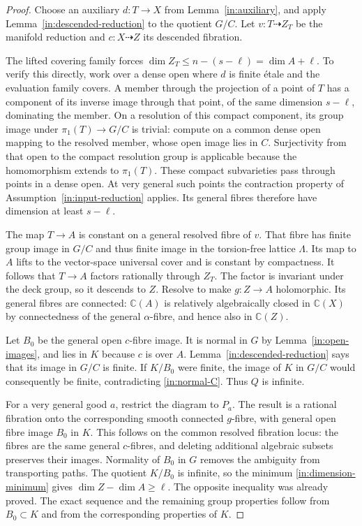 \begin{proof}
Choose an auxiliary $d:T\to X$ from Lemma~\ref{in:auxiliary}, and
apply Lemma~\ref{in:descended-reduction} to the quotient $G/C$.
Let $v:T\dashrightarrow Z_T$ be the manifold reduction and
$c:X\dashrightarrow Z$ its descended fibration.

The lifted covering family forces
$\dim Z_T\le n-(s-\ell)=\dim A+\ell$.  To verify this directly,
work over a dense open where $d$ is finite \'etale and the evaluation
family covers.  A member through the projection of a point of $T$
has a component of its inverse image through that point, of the same
dimension $s-\ell$, dominating the member.  On a resolution of this
compact component, its group image under $\pi_1(T)\to G/C$ is
trivial: compute on a common dense open mapping to the resolved member,
whose open image lies in $C$.  Surjectivity from that open to the
compact resolution group is applicable because the homomorphism
extends to $\pi_1(T)$.  These compact subvarieties pass through points
in a dense open.  At very general such points the contraction property
of Assumption~\ref{in:input-reduction} applies.  Its general fibres
therefore have dimension at least $s-\ell$.

The map $T\to A$ is constant on a general resolved fibre of $v$.
That fibre has finite group image in $G/C$ and thus finite image in
the torsion-free lattice $\Lambda$.  Its map to $A$ lifts to the
vector-space universal cover and is constant by compactness.  It
follows that $T\to A$ factors rationally through $Z_T$.  The factor
is invariant under the deck group, so it descends to $Z$.  Resolve
to make $g:Z\to A$ holomorphic.  Its general fibres are connected:
$\mathbb C(A)$ is relatively algebraically closed in $\mathbb C(X)$
by connectedness of the general $\alpha$-fibre, and hence also in
$\mathbb C(Z)$.

Let $B_0$ be the general open $c$-fibre image.  It is normal in $G$
by Lemma~\ref{in:open-images}, and lies in $K$ because $c$ is over
$A$.  Lemma~\ref{in:descended-reduction} says that its image in
$G/C$ is finite.  If $K/B_0$ were finite, the image of $K$ in $G/C$
would consequently be finite, contradicting \eqref{in:normal-C}.
Thus $Q$ is infinite.

For a very general good $a$, restrict the diagram to $P_a$.  The
result is a rational fibration onto the corresponding smooth connected
$g$-fibre, with general open fibre image $B_0$ in $K$.  This follows
on the common resolved fibration locus: the fibres are the same
general $c$-fibres, and deleting additional algebraic subsets preserves
their images.  Normality of $B_0$ in $G$ removes the ambiguity from
transporting paths.  The quotient $K/B_0$ is infinite, so the minimum
\eqref{in:dimension-minimum} gives $\dim Z-\dim A\ge\ell$.
The opposite inequality was already proved.  The exact sequence and
the remaining group properties follow from $B_0\subset K$ and from
the corresponding properties of $K$.
\end{proof}

